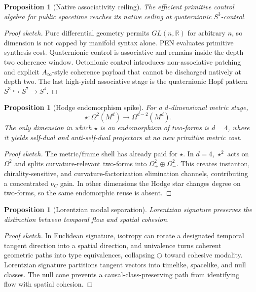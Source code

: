 \documentclass[11pt]{article}
\theoremstyle{plain}
\newtheorem{proposition}[theorem]{Proposition}
\theoremstyle{definition}
\theoremstyle{remark}
\newenvironment{proofsketch}{\begin{proof}[Proof sketch]}{\end{proof}}
\newcommand{\Next}{\bigcirc}
\newcommand{\R}{\mathbb{R}}
\begin{document}
\begin{proposition}[Native associativity ceiling]
The efficient primitive control algebra for public spacetime reaches its native ceiling at quaternionic \(S^3\)-control.
\end{proposition}

\begin{proofsketch}
Pure differential geometry permits \(GL(n,\R)\) for arbitrary \(n\), so dimension is not capped by manifold syntax alone. PEN evaluates primitive synthesis cost. Quaternionic control is associative and remains inside the depth-two coherence window. Octonionic control introduces non-associative patching and explicit \(A_\infty\)-style coherence payload that cannot be discharged natively at depth two. The last high-yield associative stage is the quaternionic Hopf pattern \(S^3\hookrightarrow S^7\to S^4\).
\end{proofsketch}

\begin{proposition}[Hodge endomorphism spike]
For a \(d\)-dimensional metric stage,
\[
\star:\Omega^2(M^d)\to\Omega^{d-2}(M^d).
\]
The only dimension in which \(\star\) is an endomorphism of two-forms is \(d=4\), where it yields self-dual and anti-self-dual projectors at no new primitive metric cost.
\end{proposition}

\begin{proofsketch}
The metric/frame shell has already paid for \(\star\). In \(d=4\), \(\star^2\) acts on \(\Omega^2\) and splits curvature-relevant two-forms into \(\Omega^2_+\oplus\Omega^2_-\). This creates instanton, chirality-sensitive, and curvature-factorization elimination channels, contributing a concentrated \(\nu_C\) gain. In other dimensions the Hodge star changes degree on two-forms, so the same endomorphic reuse is absent.
\end{proofsketch}

\begin{proposition}[Lorentzian modal separation]
Lorentzian signature preserves the distinction between temporal flow and spatial cohesion.
\end{proposition}

\begin{proofsketch}
In Euclidean signature, isotropy can rotate a designated temporal tangent direction into a spatial direction, and univalence turns coherent geometric paths into type equivalences, collapsing \(\Next\) toward cohesive modality. Lorentzian signature partitions tangent vectors into timelike, spacelike, and null classes. The null cone prevents a causal-class-preserving path from identifying flow with spatial cohesion.
\end{proofsketch}
\end{document}
